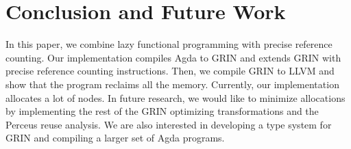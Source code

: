 \documentclass[10pt, twocolumn]{article}
\begin{document}
\section{Conclusion and Future Work}
In this paper, we combine lazy functional programming with precise reference counting.
Our implementation compiles Agda to GRIN and extends GRIN with precise reference counting instructions. 
Then, we compile GRIN to LLVM and show that the program reclaims all the memory.
Currently, our implementation allocates a lot of nodes. 
In future research, we would like to minimize allocations by implementing the rest of the GRIN optimizing transformations and the Perceus reuse analysis.
We are also interested in developing a type system for GRIN and compiling a larger set of Agda programs.




\printbibliography
\end{document}
